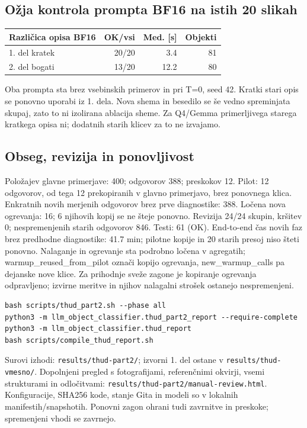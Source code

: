 \subsection*{Ožja kontrola prompta BF16 na istih 20 slikah}
\begin{center}\small\begin{tabular}{lrrr}\toprule
Različica opisa BF16 & OK/vsi & Med. [s] & Objekti \\ \midrule
1. del kratek & 20/20 & 3.4 & 81 \\
2. del bogati & 13/20 & 12.2 & 80 \\
\bottomrule\end{tabular}\end{center}

Oba prompta sta brez vsebinskih primerov in pri T=0, seed 42. Kratki stari opis se ponovno uporabi iz 1. dela. Nova shema in besedilo se še vedno spreminjata skupaj, zato to ni izolirana ablacija sheme. Za Q4/Gemma primerljivega starega kratkega opisa ni; dodatnih starih klicev za to ne izvajamo.
\subsection*{Obseg, revizija in ponovljivost}
Položajev glavne primerjave: 400; odgovorov 388; preskokov 12. Pilot: 12 odgovorov, od tega 12 prekopiranih v glavno primerjavo, brez ponovnega klica. Enkratnih novih merjenih odgovorov brez prve diagnostike: 388. Ločena nova ogrevanja: 16; 6 njihovih kopij se ne šteje ponovno. Revizija 24/24 skupin, kršitev 0; nespremenjenih starih odgovorov 846. Testi: 61 (OK).
End-to-end čas novih faz brez predhodne diagnostike: 41.7 min; pilotne kopije in 20 starih presoj niso šteti ponovno. Nalaganje in ogrevanje sta podrobno ločena v agregatih; warmup\_reused\_from\_pilot označi kopijo ogrevanja, new\_warmup\_calls pa dejanske nove klice. Za prihodnje sveže zagone je kopiranje ogrevanja odpravljeno; izvirne meritve in njihov nalagalni strošek ostanejo nespremenjeni.
\begin{verbatim}
bash scripts/thud_part2.sh --phase all
python3 -m llm_object_classifier.thud_part2_report --require-complete
python3 -m llm_object_classifier.thud_report
bash scripts/compile_thud_report.sh
\end{verbatim}
Surovi izhodi: \texttt{results/thud-part2/}; izvorni 1. del ostane v \texttt{results/thud-vmesno/}. Dopolnjeni pregled s fotografijami, referenčnimi okvirji, vsemi strukturami in odločitvami: \texttt{results/thud-part2/manual-review.html}. Konfiguracije, SHA256 kode, stanje Gita in modeli so v lokalnih manifestih/snapshotih. Ponovni zagon ohrani tudi zavrnitve in preskoke; spremenjeni vhodi se zavrnejo.

